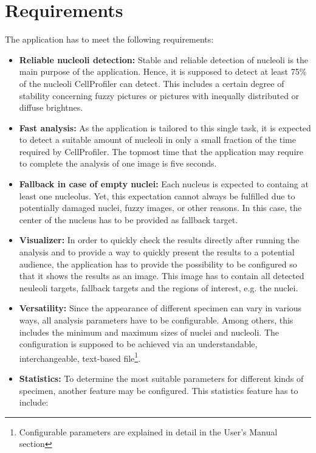 \documentclass[a4paper, 11pt]{article}
\begin{document}
\section{Requirements}\label{sec:requirements}
The application has to meet the following requirements:
\begin{itemize}
  \item \textbf{Reliable nucleoli detection:} Stable and reliable detection of
  nucleoli is the main purpose of the application. Hence, it is supposed to
  detect at least 75\% of the nucleoli CellProfiler can detect. This includes
  a certain degree of stability concerning fuzzy pictures or pictures with
  inequally distributed or diffuse brightnes.
  \item \textbf{Fast analysis:} As the application is tailored to this single
  task, it is expected to detect a suitable amount of nucleoli in only a small
  fraction of the time required by CellProfiler. The topmost time that the
  application may require to complete the analysis of one image is five seconds.
  \item \textbf{Fallback in case of empty nuclei:} Each nucleus is expected to
  containg at least one nucleolus. Yet, this expectation cannot always be
  fulfilled due to potentially damaged nuclei, fuzzy images, or other reasons.
  In this case, the center of the nucleus has to be provided as fallback target.
  \item \textbf{Visualizer:} In order to quickly check the results directly
  after running the analysis and to provide a way to quickly present the results
  to a potential audience, the application has to provide the possibility to be
  configured so that it shows the results as an image. This image has to contain
  all detected neuleoli targets, fallback targets and the regions of interest,
  e.g. the nuclei.
  \item \textbf{Versatility:} Since the appearance of different specimen can
  vary in various ways, all analysis parameters have to be configurable. Among
  others, this includes the minimum and maximum sizes of nuclei and nucleoli.
  The configuration is supposed to be achieved via an understandable,
  interchangeable, text-based file\footnote{Configurable parameters are
  explained in detail in the User's Manual section}.
  \item \textbf{Statistics:} To determine the most suitable parameters for
  different kinds of specimen, another feature may be configured. This
  statistics feature has to include:
  \begin{itemize}

\end{itemize}
\end{itemize}
\end{document}
